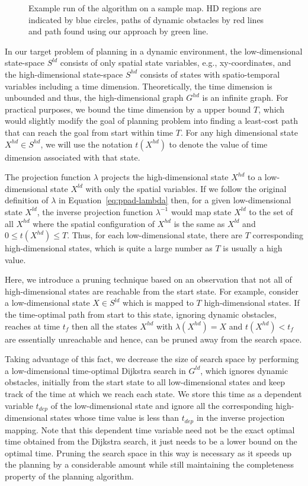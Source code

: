 \begin{figure}[ht]
  \caption{Example run of the algorithm on a sample map. HD regions are indicated by blue circles, paths of dynamic obstacles by red lines and path found using our approach by green line.}
  \label{fig:ppad-alg}
\end{figure}

In our target problem of planning in a dynamic environment,
the low-dimensional state-space $S^{ld}$ consists of only spatial state variables, e.g., xy-coordinates, and the high-dimensional state-space $S^{hd}$ consists of states with spatio-temporal variables including a time dimension. Theoretically, the time dimension is unbounded and thus, the high-dimensional graph $G^{hd}$ is an infinite graph. For practical purposes, we bound the time dimension by a upper bound $T$, which would slightly modify the goal of planning problem into finding a least-cost path that can reach the goal from start within time $T$.
For any high dimensional state $X^{hd} \in S^{hd}$, we will use the notation $t(X^{hd})$ to denote the value of time dimension associated with that state. 

The projection function $\lambda$ projects the high-dimensional state $X^{hd}$ to a low-dimensional state $X^{ld}$ with only the spatial variables. 
If we follow the original definition of $\lambda$ in Equation~\ref{eq:ppad-lambda} then, for a given low-dimensional state $X^{ld}$, the inverse projection function $\lambda^{-1}$ would map state $X^{ld}$ to the set of all $X^{hd}$ where the spatial configuration of $X^{hd}$ is the same as $X^{ld}$ and $0 \leq t(X^{hd}) \leq T$. 
Thus, for each low-dimensional state, there are $T$ corresponding high-dimensional states, which is quite a large number as $T$ is usually a high value. 

Here, we introduce a pruning technique based on an observation that not all of high-dimensional states are reachable from the start state. For example, consider a low-dimensional state $X \in S^{ld}$ which is mapped to $T$ high-dimensional states. If the time-optimal path from start to this state, ignoring dynamic obstacles, reaches at time $t_f$ then all the states $X^{hd}$ with $\lambda(X^{hd}) = X$ and $t(X^{hd}) < t_f$ are essentially unreachable and hence, can be pruned away from the search space. 

Taking advantage of this fact, we decrease the size of search space by performing a low-dimensional time-optimal Dijkstra search in $G^{ld}$, which ignores dynamic obstacles, initially from the start state to all low-dimensional states and keep track of the time at which we reach each state. 
We store this time as a dependent variable $t_{dep}$ of the low-dimensional state and ignore all the corresponding high-dimensional states whose time value is less than $t_{dep}$ in the inverse projection mapping. 
Note that this dependent time variable need not be the exact optimal time obtained from the Dijkstra search, it just needs to be a lower bound on the optimal time. Pruning the search space in this way is necessary as it speeds up the planning by a considerable amount while still maintaining the completeness property of the planning algorithm. 


